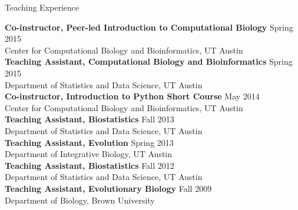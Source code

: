 \documentclass{resume} %
\begin{document}
\vspace*{0.5cm}
\begin{rSection}{Teaching Experience}
\vspace*{0.25cm}

\textbf{Co-instructor, Peer-led Introduction to Computational Biology} \hfill Spring 2015 \\ Center for Computational Biology and Bioinformatics, UT Austin \\ 

\textbf{Teaching Assistant, Computational Biology and Bioinformatics} \hfill Spring 2015 \\ Department of Statistics and Data Science, UT Austin \\ 

\textbf{Co-instructor, Introduction to Python Short Course} \hfill May 2014 \\ Center for Computational Biology and Bioinformatics, UT Austin \\ 

\textbf{Teaching Assistant, Biostatistics} \hfill Fall 2013 \\ Department of Statistics and Data Science, UT Austin \\ 

\textbf{Teaching Assistant, Evolution} \hfill Spring 2013 \\ Department of Integrative Biology, UT Austin \\ 

\textbf{Teaching Assistant, Biostatistics} \hfill Fall 2012  \\ Department of Statistics and Data Science, UT Austin \\ 

\textbf{Teaching Assistant, Evolutionary Biology} \hfill Fall 2009  \\ Department of Biology, Brown University













\end{rSection}
\vspace*{0.5cm}
\end{document}
